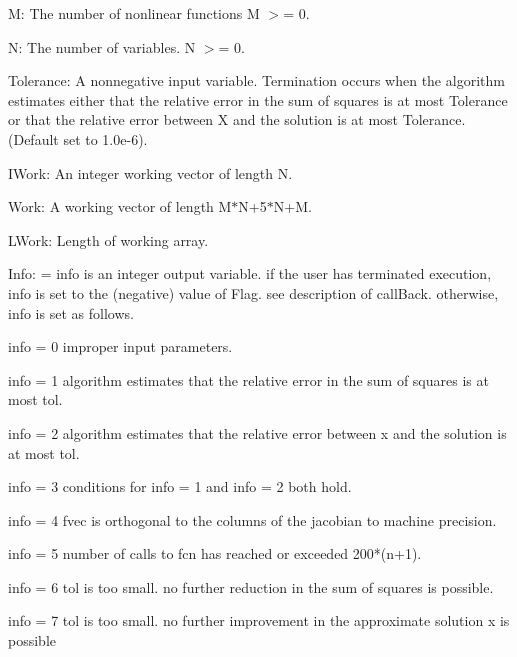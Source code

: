 \begin{DoxyItemize}
\item M\+: The number of nonlinear functions M $>$= 0.
\item N\+: The number of variables. N $>$= 0.
\item Tolerance\+: A nonnegative input variable. Termination occurs when the algorithm estimates either that the relative error in the sum of squares is at most Tolerance or that the relative error between X and the solution is at most Tolerance. (Default set to 1.\+0e-\/6).
\item I\+Work\+: An integer working vector of length N.
\item Work\+: A working vector of length M$\ast$\+N+5$\ast$\+N+\+M.
\item L\+Work\+: Length of working array.
\item Info\+: = info is an integer output variable. if the user has terminated execution, info is set to the (negative) value of Flag. see description of call\+Back. otherwise, info is set as follows. \begin{DoxyVerb}info = 0  improper input parameters.

info = 1  algorithm estimates that the relative error
          in the sum of squares is at most tol.

info = 2  algorithm estimates that the relative error
          between x and the solution is at most tol.

info = 3  conditions for info = 1 and info = 2 both hold.

info = 4  fvec is orthogonal to the columns of the
          jacobian to machine precision.

info = 5  number of calls to fcn has reached or
          exceeded 200*(n+1).

info = 6  tol is too small. no further reduction in
          the sum of squares is possible.

info = 7  tol is too small. no further improvement in
          the approximate solution x is possible
\end{DoxyVerb}

\end{DoxyItemize}

